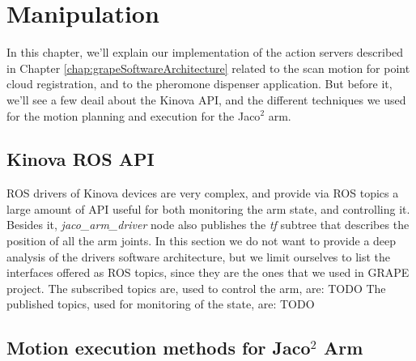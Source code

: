
\chapter{Manipulation} \label{chap:kinovaArmChapter}

In this chapter, we'll explain our implementation of the action servers described in Chapter \ref{chap:grapeSoftwareArchitecture} related to the scan motion for point cloud registration, and to the pheromone dispenser application.
But before it, we'll see a few deail about the Kinova \ac{API}, and the different techniques we used for the motion planning and execution for the Jaco$^2$ arm.

\section{Kinova ROS API}
\ac{ROS} drivers of Kinova devices are very complex, and provide via \ac{ROS} topics a large amount of \ac{API} useful for both monitoring the arm state, and controlling it. Besides it, \textit{jaco\_arm\_driver} node also publishes the \textit{tf} subtree that describes the position of all the arm joints.
In this section we do not want to provide a deep analysis of the drivers software architecture, but we limit ourselves to list the interfaces offered as \ac{ROS} topics, since they are the ones that we used in \ac{GRAPE} project. The subscribed topics are, used to control the arm, are: TODO
The published topics, used for monitoring of the state, are: TODO



\section{Motion execution methods for Jaco$^2$ Arm}

